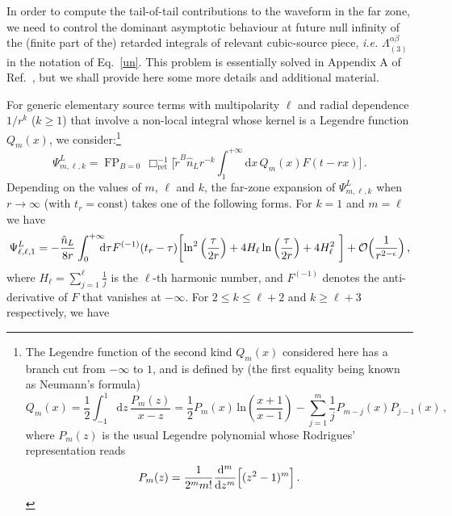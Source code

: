 \documentclass[prd,preprint,superscriptaddress,tightenlines,nofootinbib,
  eqsecnum,showpacs]{revtex4}
\newcommand{\ud}{\mathrm{d}}
\begin{document}
In order to compute the tail-of-tail contributions to the waveform in
the far zone, we need to control the dominant asymptotic behaviour at
future null infinity of the (finite part of the) retarded integrals of
relevant cubic-source piece, \textit{i.e.}
$\Lambda^{\alpha\beta}_{(3)}$ in the notation of Eq.~\eqref{un}. This
problem is essentially solved in Appendix A of Ref.~\cite{B98tail},
but we shall provide here some more details and additional material.

For generic elementary source terms with multipolarity $\ell$ and
radial dependence $1/r^{k}$ ($k\geqslant 1$) that involve a non-local
integral whose kernel is a Legendre function $Q_m(x)$, we
consider:\footnote{The Legendre function of the second kind $Q_m(x)$
  considered here has a branch cut from $-\infty$ to $1$, and is
  defined by (the first equality being known as Neumann's formula)
%
\begin{equation}\label{legendre}
Q_m(x) = \frac{1}{2} \int_{-1}^1 \ud z\,\frac{P_m(z)}{x-z} =
\frac{1}{2} P_m (x) \, \mathrm{ln} \left(\frac{x+1}{x-1} \right)-
\sum^{m}_{ j=1} \frac{1}{j} P_{m-j}(x) P_{j-1}(x)\,,
\end{equation}
%
where $P_m(z)$ is the usual Legendre polynomial whose Rodrigues'
representation reads
%
\begin{equation}\label{rodrigues}
P_m(z) = \frac{1}{2^m m!} \frac{\ud^m}{\ud z^m}
\Bigl[(z^2-1)^m\Bigr]\,.
\end{equation}
%
}
%
\begin{equation}
\Psi^L_{m,\ell,k}= \mathop{\mathrm{FP}}_{B=0} \, \Box^{-1}_\mathrm{ret}
\Big[\widetilde{r}^B \hat{n}_L r^{-k}\int^{+\infty}_1\!\!\!\!  \ud x
  \, Q_m(x) F (t - rx) \Big] \,.
\end{equation}
%
Depending on the values of $m$, $\ell$ and $k$, the far-zone expansion
of $\Psi^L_{m,\ell,k}$ when $r\to\infty$ (with $t_r=\text{const}$)
takes one of the following forms. For $k=1$ and $m=\ell$ we have
%
\begin{equation}\label{eq:1lPsiL}
\Psi^L_{\ell,\ell,1} = -{\hat{n}_L\over 8r} \int^{+\infty}_0 \! \!
\!\!\ud\tau F^{(-1)} (t_r - \tau) \biggl[ \ln^2 \Big( \frac{\tau}{2r}
  \Big) + 4 H_\ell \ln \Big( \frac{\tau}{2r} \Big) + 4 H^2_\ell
  ~\biggr] + \mathcal{O}\Big( \frac{1}{r^{2-\epsilon}}\Big) \,,
\end{equation}
%
where $H_\ell=\sum_{j=1}^\ell \frac{1}{j}$ is the $\ell$-th harmonic
number, and $F^{(-1)}$ denotes the anti-derivative of $F$ that
vanishes at $-\infty$. For $2 \leqslant k \leqslant \ell+2$ and
$k\geqslant \ell +3$ respectively, we have
\end{document}
